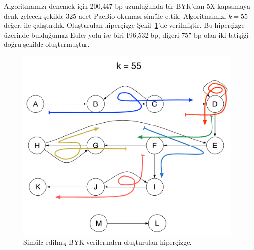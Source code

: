 Algoritmamızı denemek için 200,447 bp uzunluğunda bir BYK'dan 5X kapsamaya denk gelecek şekilde 325 adet PacBio okuması simüle ettik. Algoritmamızı $k=55$ değeri ile çalıştırdık. Oluşturulan hiperçizge Şekil~\ref{fig:bac-hypergraph}'de verilmiştir. Bu hiperçizge üzerinde bulduğumuz Euler yolu ise biri 196,532 bp, diğeri 757 bp olan iki bitişiği doğru şekilde oluşturmuştur.

\begin{figure}[htb]
  \begin{center}
    \includegraphics[scale=0.6]{k55.pdf}
  \end{center}
  \caption{Simüle edilmiş BYK verilerinden oluşturulan hiperçizge.}
  \label{fig:bac-hypergraph}
\end{figure}

